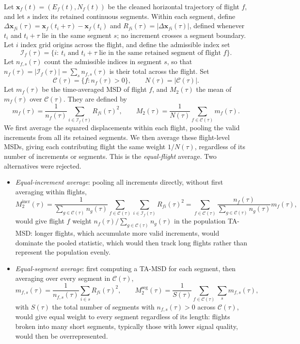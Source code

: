 Let $\boldsymbol{x}_f(t)=(E_f(t),N_f(t))$ be the cleaned horizontal trajectory of flight
$f$, and let $s$ index its retained continuous segments. Within each segment, define
$\Delta\boldsymbol{x}_{fi}(\tau)=\boldsymbol{x}_f(t_i+\tau)-\boldsymbol{x}_f(t_i)$
and $R_{fi}(\tau)=|\Delta\boldsymbol{x}_{fi}(\tau)|$, defined whenever $t_i$ and
$t_i+\tau$ lie in the same segment $s$; no increment crosses a segment boundary.
Let $i$ index grid origins across the flight, and define the admissible index set
\[
 \mathcal I_f(\tau)=\{i:\ t_i\text{ and }t_i+\tau
 \text{ lie in the same retained segment of flight }f\}.
\]
Let $n_{f,s}(\tau)$ count the admissible
indices in segment $s$, so that $n_f(\tau)=|\mathcal I_f(\tau)|=\sum_s n_{f,s}(\tau)$
is their total across the flight. Set
\[
 \mathcal C(\tau)=\{f : n_f(\tau)>0\}, \qquad N(\tau)=|\mathcal C(\tau)|.
\]
Let $m_f(\tau)$ be the time-averaged MSD of flight $f$, and
$M_2(\tau)$ the mean of $m_f(\tau)$ over $\mathcal C(\tau)$. They are defined by
\begin{equation}
 m_f(\tau)=\frac{1}{n_f(\tau)}\sum_{i\in\mathcal I_f(\tau)}R_{fi}(\tau)^2,
 \qquad M_2(\tau)=\frac{1}{N(\tau)}\sum_{f\in\mathcal C(\tau)}m_f(\tau).
 \label{eq:fixed-msd}
\end{equation}
We first average the squared displacements within each flight, pooling the valid
increments from all its retained segments. We then average these flight-level MSDs,
giving each contributing flight the same weight $1/N(\tau)$, regardless of its
number of increments or segments. This is the \emph{equal-flight} average.
Two alternatives were rejected.
\begin{itemize}
 \item \emph{Equal-increment average}: pooling all increments directly, without
 first averaging within flights,
 \[
  M_2^{\mathrm{incr}}(\tau)=\frac{1}{\sum_{g\in\mathcal C(\tau)}n_g(\tau)}
  \sum_{f\in\mathcal C(\tau)}\sum_{i\in\mathcal I_f(\tau)}R_{fi}(\tau)^2
  =\sum_{f\in\mathcal C(\tau)}\frac{n_f(\tau)}{\sum_{g\in\mathcal C(\tau)}n_g(\tau)}
  m_f(\tau),
 \]
 would give flight $f$ weight $n_f(\tau)/\sum_{g\in\mathcal C(\tau)}n_g(\tau)$ in
 the population TA-MSD: longer flights, which accumulate more valid increments,
 would dominate the pooled statistic, which would then track long flights rather
 than represent the population evenly.
 \item \emph{Equal-segment average}: first computing a TA-MSD for each segment,
 then averaging over every segment in $\mathcal C(\tau)$,
 \[
  m_{f,s}(\tau)=\frac{1}{n_{f,s}(\tau)}\sum_{i\in s}R_{fi}(\tau)^2, \qquad
  M_2^{\mathrm{seg}}(\tau)=\frac{1}{S(\tau)}\sum_{f\in\mathcal C(\tau)}\sum_{s}
  m_{f,s}(\tau),
 \]
 with $S(\tau)$ the total number of segments with $n_{f,s}(\tau)>0$ across
 $\mathcal C(\tau)$, would give equal weight to every segment regardless of its
 length: flights broken into many short segments, typically those with lower
 signal quality, would then be overrepresented.
\end{itemize}

